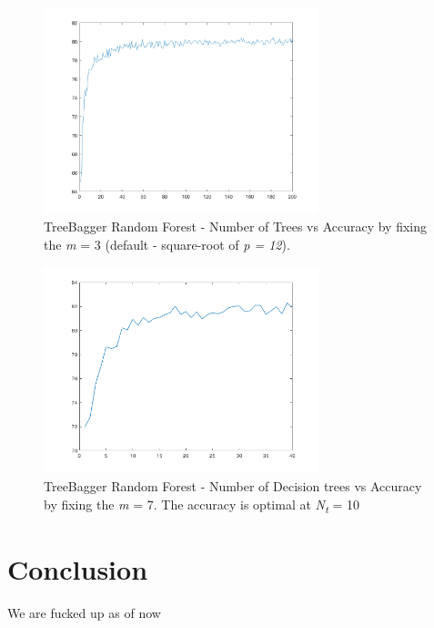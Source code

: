 \documentclass[journal, a4paper]{IEEEtran}
\begin{document}
\begin{figure}[ht!]
\centering
\includegraphics[width=80mm]{images/RandomForestPrediction200.png}
\caption{TreeBagger Random Forest - Number of Trees vs Accuracy by fixing the \textit{m} = 3 (default - square-root of \textit{p = 12}).}
\label{tbrfnumpred}
\end{figure}

\begin{figure}[ht!]
\centering
\includegraphics[width=80mm]{images/TBRF_NTrees_1_to_40.png}
\caption{TreeBagger Random Forest - Number of Decision trees vs Accuracy by fixing the \textit{m} = 7. The accuracy is optimal at \textit{N\textsubscript{t}} = 10}
\label{tbrfnumtrees}
\end{figure}

\section{Conclusion}
We are fucked up as of now
\end{document}
